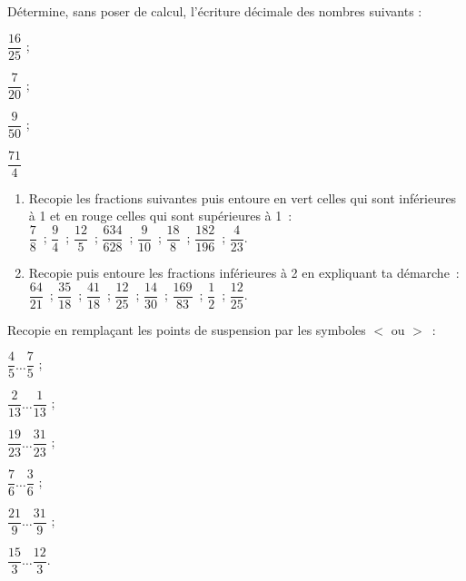 \begin{exercice}
Détermine, sans poser de calcul, l'écriture décimale des nombres suivants :
\begin{colenumerate}{4}
 \item $\dfrac{16}{25}$ ; 
 \item $\dfrac{7}{20}$ ; 
 \item $\dfrac{9}{50}$ ; 
 \item $\dfrac{71}{4}$
 \end{colenumerate}
\end{exercice}



\begin{exercice}
\begin{enumerate}
 \item Recopie les fractions suivantes puis entoure en vert celles qui sont inférieures à 1 et en rouge celles qui sont supérieures à 1 : \\[0.5em]
 $\dfrac{7}{8}$ ;  $\dfrac{9}{4}$ ;  $\dfrac{12}{5}$ ;  $\dfrac{634}{628}$ ;  $\dfrac{9}{10}$ ;  $\dfrac{18}{8}$ ;  $\dfrac{182}{196}$ ;  $\dfrac{4}{23}$.
 \vspace{0.2cm}
 \item Recopie puis entoure les fractions inférieures à 2 en expliquant ta démarche : \\[0.5em]
 $\dfrac{64}{21}$ ;  $\dfrac{35}{18}$ ;  $\dfrac{41}{18}$ ;  $\dfrac{12}{25}$ ;  $\dfrac{14}{30}$ ;  $\dfrac{169}{83}$ ;  $\dfrac{1}{2}$ ;  $\dfrac{12}{25}$.
 \end{enumerate}
\end{exercice}


\begin{exercice}
Recopie en remplaçant les points de suspension par les symboles $<$ ou $>$ :
\begin{colenumerate}{3}
 \item $\dfrac{4}{5} \ldots \dfrac{7}{5}$ ; 
 \vspace{0.2cm}
 \item $\dfrac{2}{13} \ldots \dfrac{1}{13}$ ; 
 \item $\dfrac{19}{23} \ldots \dfrac{31}{23}$ ; 
 \item $\dfrac{7}{6} \ldots \dfrac{3}{6}$ ; 
 \item $\dfrac{21}{9} \ldots \dfrac{31}{9}$ ; 
 \item $\dfrac{15}{3} \ldots \dfrac{12}{3}$.
 \end{colenumerate}
\end{exercice}


